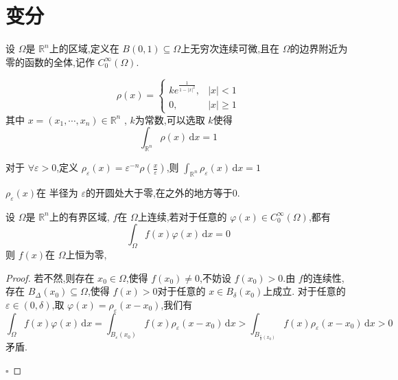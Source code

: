 \documentclass[../../PDE.tex]{subfiles}
\begin{document}
\section{变分}

\begin{definition}
    设 \(   \Omega   \)是 \(  \mathbb{R} ^{n}  \)上的区域,定义在 \(  B\left( 0,1 \right)\subseteq  \Omega    \)上无穷次连续可微,且在 \(   \Omega   \)的边界附近为零的函数的全体,记作 \(  C_{0}^{\infty}\left(  \Omega  \right)   \).     
\end{definition}

\begin{example}
     \[
     \rho \left( x \right)=  \begin{cases}  ke^{ \frac{1 }{1- \left| x \right|^{2}  } },& \left| x \right|<1\\ 
       0,& \left| x \right|\ge 1   \end{cases}  
     \]其中 \(  x =  \left(  x_1,\cdots,x_n  \right)\in \mathbb{R} ^{n}   \) , \(  k  \)为常数,可以选取 \(  k  \)使得 \[
     \int_{\mathbb{R} ^{n}}\rho \left( x \right)\,\mathrm{d} x= 1 
     \]  
\end{example}

对于 \(  \forall \varepsilon >0  \),定义 \(  \rho _{\varepsilon }\left( x \right) =  \varepsilon ^{-n}\rho \left(  \frac{x }{\varepsilon  }  \right)    \),则 \(  \int_{\mathbb{R} ^{n}}\rho _{\varepsilon }\left( x \right)\,\mathrm{d} x= 1   \)   
\hspace*{\fill} 


\begin{remark}
    \(  \rho _{\varepsilon }\left( x \right)   \)在 半径为 \(  \varepsilon   \)的开圆处大于零,在之外的地方等于0.  
\end{remark}
\begin{lemma}
   设 \(   \Omega   \)是 \(  \mathbb{R} ^{n}  \)上的有界区域, \(  f  \)在 \(   \Omega   \)上连续,若对于任意的 \(   \varphi \left( x \right)\in C_{0}^{\infty}\left(  \Omega  \right)    \),都有 \[
   \int_{ \Omega }f\left( x \right) \varphi \left( x \right)\,\mathrm{d} x= 0  
   \]则 \(  f\left( x \right)   \)在 \(   \Omega   \)上恒为零,       
\end{lemma}

\begin{proof}
    若不然,则存在 \(  x_0 \in  \Omega   \),使得 \(  f\left( x_0 \right)   \neq 0\),不妨设 \(  f\left( x_0 \right)>0   \).由 \(  f  \)的连续性,存在 \(  B_{ \Delta }\left( x_0 \right) \subseteq  \Omega    \),使得 \(  f\left( x \right)>0   \)对于任意的 \(  x \in B_{ \delta }\left( x_0 \right)   \)上成立.
    对于任意的 \(  \varepsilon  \in \left( 0, \delta   \right)   \),取  \(   \varphi \left( x \right)= \rho _{\varepsilon }\left( x-x_0 \right)    \),我们有 \[
    \int_{ \Omega }f\left( x \right) \varphi \left( x \right)\,\mathrm{d} x =  \int_{B_{\varepsilon }\left( x_0 \right) } f\left( x \right)\rho _{\varepsilon }\left( x-x_0 \right)    \,\mathrm{d} x >  \int_{B_{\frac{\varepsilon  }{2 }\left( x_0 \right)  }}f\left( x \right)\rho _{\varepsilon } \left( x-x_0 \right) \,\mathrm{d} x>0
    \]         矛盾.

    \hfill $\square$
\end{proof}
\end{document}
